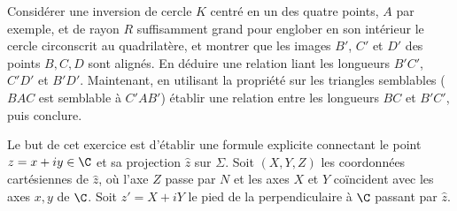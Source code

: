\begin{exer}
Considérer une inversion de cercle $K$ centré en un des quatre points, $A$ par exemple, et de rayon $R$ suffisamment grand pour englober en son intérieur le cercle circonscrit au quadrilatère, et montrer que les images $B'$, $C'$ et $D'$ des points $B,C,D$ sont alignés. En déduire une relation liant les longueurs $B'C'$, $C'D'$ et $B'D'$. Maintenant, en utilisant la propriété sur les triangles semblables ($BAC$ est semblable à $C'AB'$) établir une relation entre les longueurs $BC$ et $B'C'$, puis conclure.
\end{exer}


\begin{exer}
Le but de cet exercice est d'établir une formule explicite connectant le point $z = x +i y \in \C$ et sa projection $\hat{z}$ sur $\Sigma$. Soit $(X,Y,Z)$ les coordonnées cartésiennes de $\hat{z}$, où l'axe $Z$ passe par $N$ et les axes $X$ et $Y$ coïncident avec les axes $x,y$ de $\C$.  Soit $z' = X+i Y$ le pied de la perpendiculaire à $\C$ passant par $\hat{z}$. 


\end{exer}
